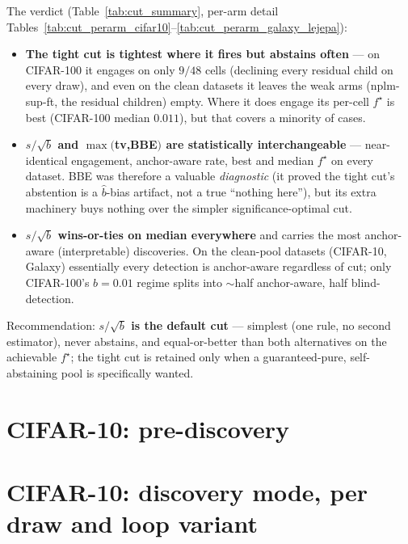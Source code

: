 \documentclass[10pt]{article}
\begin{document}
The verdict (Table~\ref{tab:cut_summary}, per-arm detail
Tables~\ref{tab:cut_perarm_cifar10}--\ref{tab:cut_perarm_galaxy_lejepa}):
\begin{itemize}
\item \textbf{The tight cut is tightest where it fires but abstains often}
  --- on CIFAR-100 it engages on only $9/48$ cells (declining every residual
  child on every draw), and even on the clean datasets it leaves the weak arms
  (nplm-sup-ft, the residual children) empty.  Where it does engage its
  per-cell $f^\star$ is best (CIFAR-100 median $0.011$), but that covers a
  minority of cases.
\item \textbf{$s/\sqrt{b}$ and $\max($tv,BBE$)$ are statistically
  interchangeable} --- near-identical engagement, anchor-aware rate, best and
  median $f^\star$ on every dataset.  BBE was therefore a valuable
  \emph{diagnostic} (it proved the tight cut's abstention is a $\hat b$-bias
  artifact, not a true ``nothing here''), but its extra machinery buys nothing
  over the simpler significance-optimal cut.
\item \textbf{$s/\sqrt{b}$ wins-or-ties on median everywhere} and carries the
  most anchor-aware (interpretable) discoveries.  On the clean-pool datasets
  (CIFAR-10, Galaxy) essentially every detection is anchor-aware regardless of
  cut; only CIFAR-100's $b{=}0.01$ regime splits into $\sim$half anchor-aware,
  half blind-detection.
\end{itemize}
Recommendation: \textbf{$s/\sqrt{b}$ is the default cut} --- simplest (one
rule, no second estimator), never abstains, and equal-or-better than both
alternatives on the achievable $f^\star$; the tight cut is retained only when
a guaranteed-pure, self-abstaining pool is specifically wanted.




\clearpage
\section*{CIFAR-10: pre-discovery}

\clearpage

\clearpage
\section*{CIFAR-10: discovery mode, per draw and loop variant}



\clearpage



\clearpage



\clearpage



\clearpage
\end{document}
